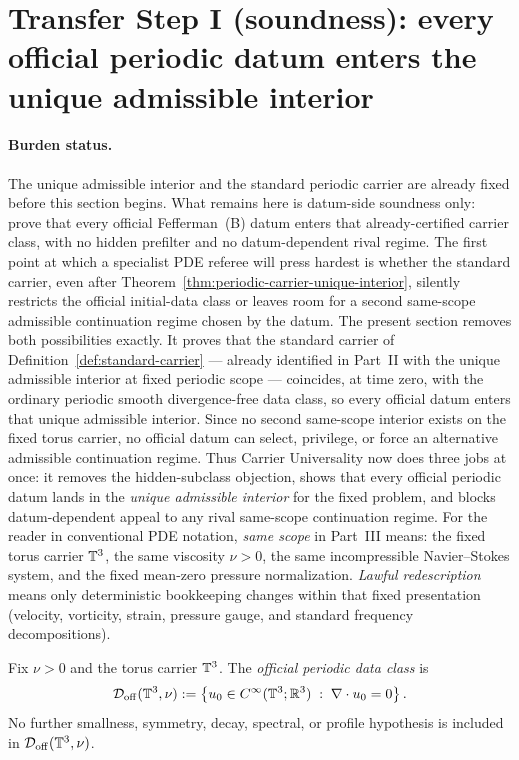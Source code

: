 \section{Transfer Step I (soundness): every official periodic datum enters the unique admissible interior}\label{sec:carrier-universality}
\paragraph{Burden status.}
The unique admissible interior and the standard periodic carrier are already fixed before this section begins. What remains here is datum-side soundness only: prove that every official Fefferman~(B) datum enters that already-certified carrier class, with no hidden prefilter and no datum-dependent rival regime.
The first point at which a specialist PDE referee will press hardest is whether the standard carrier,
even after Theorem~\ref{thm:periodic-carrier-unique-interior}, silently restricts the official
initial-data class or leaves room for a second same-scope admissible continuation regime chosen by
the datum. The present section removes both possibilities exactly. It proves that the standard
carrier of Definition~\ref{def:standard-carrier} --- already identified in Part~II with the unique
admissible interior at fixed periodic scope --- coincides, at time zero, with the ordinary periodic
smooth divergence-free data class, so every official datum enters that unique admissible interior.
Since no second same-scope interior exists on the fixed torus carrier, no official datum
can select, privilege, or force an alternative admissible continuation regime. Thus Carrier
Universality now does three jobs at once: it removes the hidden-subclass objection, shows that every
official periodic datum lands in the \emph{unique admissible interior} for the fixed problem, and
blocks datum-dependent appeal to any rival same-scope continuation regime.
For the reader in conventional PDE notation, \emph{same scope} in Part~III means: the fixed torus
carrier $\mathbb{T}^3$, the same viscosity $\nu>0$, the same incompressible Navier--Stokes system, and the
fixed mean-zero pressure normalization. \emph{Lawful redescription} means only deterministic
bookkeeping changes within that fixed presentation (velocity, vorticity, strain, pressure gauge,
and standard frequency decompositions).

\begin{definition}\label{def:official-periodic-data}
Fix $\nu>0$ and the torus carrier $\mathbb{T}^3$. The \emph{official periodic data class} is
\[
\mathcal D_{\mathrm{off}}(\mathbb{T}^3,\nu)
:=
\left\{
 u_0\in C^\infty(\mathbb{T}^3;\mathbb{R}^3)\;:\;\nabla\cdot u_0=0
\right\}.
\]
No further smallness, symmetry, decay, spectral, or profile hypothesis is included in
$\mathcal D_{\mathrm{off}}(\mathbb{T}^3,\nu)$.
\end{definition}

